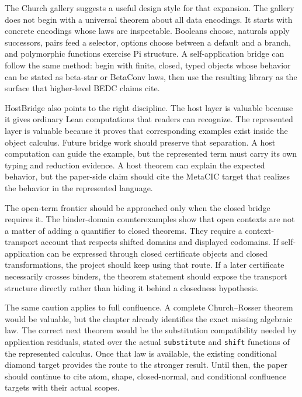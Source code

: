 The Church gallery suggests a useful design style for that expansion.  The
gallery does not begin with a universal theorem about all data encodings.  It
starts with concrete encodings whose laws are inspectable.  Booleans choose,
naturals apply successors, pairs feed a selector, options choose between a
default and a branch, and polymorphic functions exercise Pi structure.  A
self-application bridge can follow the same method: begin with finite,
closed, typed objects whose behavior can be stated as beta-star or BetaConv
laws, then use the resulting library as the surface that higher-level BEDC
claims cite.

HostBridge also points to the right discipline.  The host layer is valuable
because it gives ordinary Lean computations that readers can recognize.  The
represented layer is valuable because it proves that corresponding examples
exist inside the object calculus.  Future bridge work should preserve that
separation.  A host computation can guide the example, but the represented
term must carry its own typing and reduction evidence.  A host theorem can
explain the expected behavior, but the paper-side claim should cite the
MetaCIC target that realizes the behavior in the represented language.

The open-term frontier should be approached only when the closed bridge
requires it.  The binder-domain counterexamples show that open contexts are
not a matter of adding a quantifier to closed theorems.  They require a
context-transport account that respects shifted domains and displayed
codomains.  If self-application can be expressed through closed certificate
objects and closed transformations, the project should keep using that route.
If a later certificate necessarily crosses binders, the theorem statement
should expose the transport structure directly rather than hiding it behind a
closedness hypothesis.

The same caution applies to full confluence.  A complete Church--Rosser
theorem would be valuable, but the chapter already identifies the exact
missing algebraic law.  The correct next theorem would be the substitution
compatibility needed by application residuals, stated over the actual
\texttt{substitute} and \texttt{shift} functions of the represented calculus.
Once that law is available, the existing conditional diamond target provides
the route to the stronger result.  Until then, the paper should continue to
cite atom, shape, closed-normal, and conditional confluence targets with their
actual scopes.

